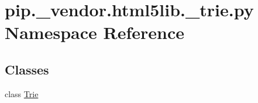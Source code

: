 \hypertarget{namespacepip_1_1__vendor_1_1html5lib_1_1__trie_1_1py}{}\section{pip.\+\_\+vendor.\+html5lib.\+\_\+trie.\+py Namespace Reference}
\label{namespacepip_1_1__vendor_1_1html5lib_1_1__trie_1_1py}
\subsection*{Classes}
\begin{DoxyCompactItemize}
\item 
class \hyperlink{classpip_1_1__vendor_1_1html5lib_1_1__trie_1_1py_1_1Trie}{Trie}
\end{DoxyCompactItemize}
